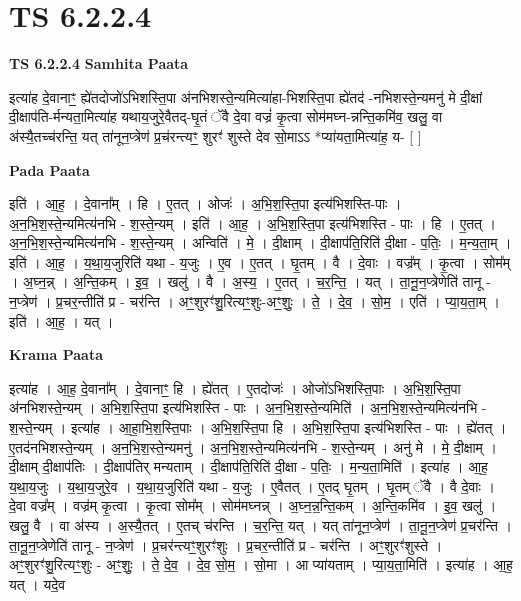 \documentclass[17pt]{extarticle}
\begin{document}
\section{ TS 6.2.2.4 }

\textbf{TS 6.2.2.4 } \newline
\textbf{Samhita Paata} \newline

इत्या॑ह दे॒वानाꣳ॒॒ ह्ये॑तदोजो॑ऽभिशस्ति॒पा अ॑नभिशस्ते॒न्यमित्या॑हा-भिशस्ति॒पा ह्ये॑तद॑ -नभिशस्ते॒न्यमनु॑ मे दी॒क्षां दी॒क्षाप॑ति-र्मन्यता॒मित्या॑ह यथाय॒जुरे॒वैतद्-घृ॒तं ॅवै दे॒वा वज्रं॑ कृ॒त्वा सोम॑मघ्न-न्नन्ति॒कमि॑व॒ खलु॒ वा अ॑स्यै॒तच्च॑रन्ति॒ यत् ता॑नून॒प्त्रेण॑ प्र॒च॑रन्त्यꣳ॒॒ शुरꣳ॑ शुस्ते देव सो॒माऽऽ *प्या॑यता॒मित्या॑ह॒ य- [  ] \newline

\textbf{Pada Paata} \newline

इति॑ । आ॒ह॒ । दे॒वाना᳚म् । हि । ए॒तत् । ओजः॑ । अ॒भि॒श॒स्ति॒पा इत्य॑भिशस्ति-पाः । अ॒न॒भि॒श॒स्ते॒न्यमित्य॑नभि - श॒स्ते॒न्यम् । इति॑ । आ॒ह॒ । अ॒भि॒श॒स्ति॒पा इत्य॑भिशस्ति - पाः । हि । ए॒तत् । अ॒न॒भि॒श॒स्ते॒न्यमित्य॑नभि - श॒स्ते॒न्यम् । अन्विति॑ । मे॒ । दी॒क्षाम् । दी॒क्षाप॑ति॒रिति॑ दी॒क्षा - प॒तिः॒ । म॒न्य॒ता॒म् । इति॑ । आ॒ह॒ । य॒था॒य॒जुरिति॑ यथा - य॒जुः । ए॒व । ए॒तत् । घृ॒तम् । वै । दे॒वाः । वज्र᳚म् । कृ॒त्वा । सोम᳚म् । अ॒घ्न॒न्न् । अ॒न्ति॒कम् । इ॒व॒ । खलु॑ । वै । अ॒स्य॒ । ए॒तत् । च॒र॒न्ति॒ । यत् । ता॒नू॒न॒प्त्रेणेति॑ तानू - न॒प्त्रेण॑ । प्र॒चर॒न्तीति॑ प्र - चर॑न्ति । अꣳ॒॒शुरꣳ॑शु॒रित्यꣳ॒॒शुः-अꣳ॒॒शुः॒ । ते॒ । दे॒व॒ । सो॒म॒ । एति॑ । प्या॒य॒ता॒म् । इति॑ । आ॒ह॒ । यत् ।  \newline


\textbf{Krama Paata} \newline

इत्या॑ह । आ॒ह॒ दे॒वाना᳚म् । दे॒वानाꣳ॒॒ हि । ह्ये॑तत् । ए॒तदोजः॑ । ओजो॑ऽभिशस्ति॒पाः । अ॒भि॒श॒स्ति॒पा अ॑नभिशस्ते॒न्यम् । अ॒भि॒श॒स्ति॒पा इत्य॑भिशस्ति - पाः । अ॒न॒भि॒श॒स्ते॒न्यमिति॑ । अ॒न॒भि॒श॒स्ते॒न्यमित्य॑नभि - श॒स्ते॒न्यम् । इत्या॑ह । आ॒हा॒भि॒श॒स्ति॒पाः । अ॒भि॒श॒स्ति॒पा हि । अ॒भि॒श॒स्ति॒पा इत्य॑भिशस्ति - पाः । ह्ये॑तत् । ए॒तद॑नभिशस्ते॒न्यम् । अ॒न॒भि॒श॒स्ते॒न्यमनु॑ । अ॒न॒भि॒श॒स्ते॒न्यमित्य॑नभि - श॒स्ते॒न्यम् । अनु॑ मे । मे॒ दी॒क्षाम् । दी॒क्षाम् दी॒क्षाप॑तिः । दी॒क्षाप॑तिर् मन्यताम् । दी॒क्षाप॑ति॒रिति॑ दी॒क्षा - प॒तिः॒ । म॒न्य॒ता॒मिति॑ । इत्या॑ह । आ॒ह॒ य॒था॒य॒जुः । य॒था॒य॒जुरे॒व । य॒था॒य॒जुरिति॑ यथा - य॒जुः । ए॒वैतत् । ए॒तद् घृ॒तम् । घृ॒तम् ॅवै । वै दे॒वाः । दे॒वा वज्र᳚म् । वज्र॑म् कृ॒त्वा । कृ॒त्वा सोम᳚म् । सोम॑मघ्नन्न् । अ॒घ्न॒न्न॒न्ति॒कम् । अ॒न्ति॒कमि॑व । इ॒व॒ खलु॑ । खलु॒ वै । वा अ॑स्य । अ॒स्यै॒तत् । ए॒तच् च॑रन्ति । च॒र॒न्ति॒ यत् । यत् ता॑नून॒प्त्रेण॑ । ता॒नू॒न॒प्त्रेण॑ प्र॒चर॑न्ति । ता॒नू॒न॒प्त्रेणेति॑ तानू - न॒प्त्रेण॑ । प्र॒चर॑न्त्यꣳ॒॒शुरꣳ॑शुः । प्र॒चर॒न्तीति॑ प्र - चर॑न्ति । अꣳ॒॒शुरꣳ॑शुस्ते । अꣳ॒॒शुरꣳ॑शु॒रित्यꣳ॒॒शुः - अꣳ॒॒शुः॒ । ते॒ दे॒व॒ । दे॒व॒ सो॒म॒ । सो॒मा । आ प्या॑यताम् । प्या॒य॒ता॒मिति॑ । इत्या॑ह । आ॒ह॒ यत् । यदे॒व \newline
\end{document}
